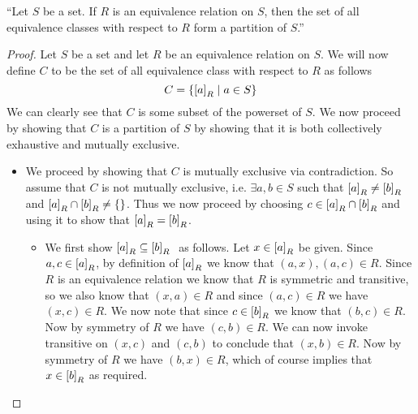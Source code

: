         \begin{theorem}
            ``Let $S$ be a set. If $R$ is an equivalence relation on $S$, then
            the set of all equivalence classes with respect to $R$ form a 
            partition of $S$.''
        \end{theorem}
        \begin{proof}
            Let $S$ be a set and let $R$ be an equivalence relation on $S$. We will
            now define $C$ to be the set of all equivalence class with respect to $R$
            as follows
            \[
                C = \left\{\left[a\right]_{R} \mid a \in S\right\}
            \]
            We can clearly see that $C$ is some subset of the powerset of $S$.
            We now proceed by showing that $C$ is a partition of $S$ by showing that
            it is both collectively exhaustive and mutually exclusive.
            \begin{itemize}
                \item
                    We proceed by showing that $C$ is mutually exclusive via contradiction.
                    So assume that $C$ is not mutually exclusive, i.e. $\exists a, b \in S$
                    such that $\left[a\right]_{R} \neq \left[b\right]_{R}$ and 
                    $\left[a\right]_{R} \cap \left[b\right]_{R} \neq \left\{\right\}$.
                    Thus we now proceed by choosing $c \in \left[a\right]_{R} \cap \left[b\right]_{R}$
                    and using it to show that $\left[a\right]_{R} = \left[b\right]_{R}$.
                    \begin{itemize}
                        \item
                            We first show $\left[a\right]_{R} \subseteq \left[b\right]_{R} \ $ as follows.
                            Let $x \in \left[a\right]_{R}$ be given. Since $a, c \in \left[a\right]_{R}$, by 
                            definition of $\left[a\right]_{R}$ we know that $(a, x), (a, c) \in R$.
                            Since $R$ is an equivalence relation we know that $R$ is symmetric and transitive,
                            so we also know that $(x, a) \in R$ and since $(a, c) \in R$ we have $(x, c) \in R$.
                            We now note that since $c \in \left[b\right]_{R}$ we know that $(b, c) \in R$. Now by
                            symmetry of $R$ we have $(c, b) \in R$. We can now invoke transitive on
                            $(x, c)$ and $(c, b)$ to conclude that $(x, b) \in R$. Now by symmetry of $R$ we
                            have $(b, x) \in R$, which of course implies that $x \in \left[b\right]_{R}$ as required.

\end{itemize}
\end{itemize}
\end{proof}
